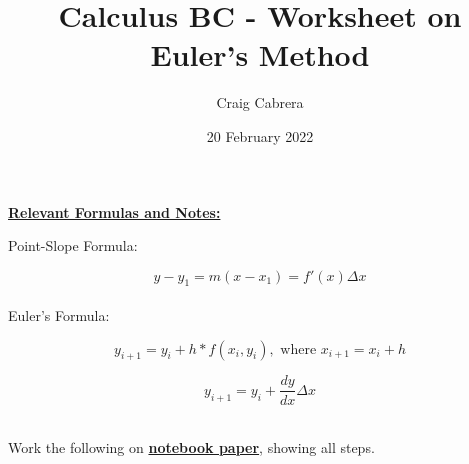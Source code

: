 \documentclass[10pt,letterpaper]{report}
\title{Calculus BC - Worksheet on Euler's Method}
\author{Craig Cabrera}
\date{20 February 2022}
\begin{document}
\maketitle
\begin{center}
  \textbf{\underline{Relevant Formulas and Notes:}}
\end{center}
\noindent Point-Slope Formula:

$$y-y_{1}=m\left(x-x_{1}\right)=f'(x)\Delta x$$ \\

\noindent Euler's Formula:  

$$y_{i+1}=y_{i}+h*f(x_{i}, y_{i}), \text{ where } x_{i+1}=x_{i}+h$$

$$y_{i+1}=y_{i}+\frac{dy}{dx}\Delta x$$ \\
\pagebreak 


Work the following on \textbf{\underline{notebook paper}}, showing all steps.
\end{document}
